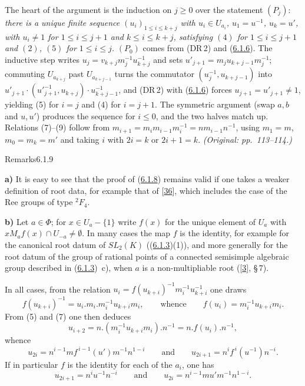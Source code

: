 \documentclass[12pt,a4paper,oneside,english]{smfart}
\makeatletter
\newcommand{\btanchor}[1]{\leavevmode\Hy@raisedlink{\hypertarget{bt:#1}{}}}
\newcommand{\btref}[1]{\hyperlink{bt:#1}{#1}}
\newcommand{\btbib}[1]{\hyperlink{bib:#1}{#1}}
\theoremstyle{definition}
\theoremstyle{bt}
\makeatother
\begin{document}
\begin{sketch}
The heart of the argument is the induction on $j\ge0$ over the statement
$(P_j)$: \emph{there is a unique finite sequence $(u_i)_{1\le i\le k+j}$ with
$u_i\in U_{a_i}$, $u_1=u^{-1}$, $u_k=u'$, with $u_i\ne1$ for $1\le i\le j+1$ and
$k\le i\le k+j$, satisfying $(4)$ for $1\le i\le j+1$ and $(2)$, $(5)$ for
$1\le i\le j$.} $(P_0)$ comes from (DR\,2) and (\btref{6.1.6}). The inductive step writes
$u_j=v_{k+j}m_j^{-1}u_{k+j}^{-1}$ and sets
$u'_{j+1}=m_ju_{k+j-1}m_j^{-1}$; commuting $U_{a_{k+j}}$ past $U_{a_{k+j-1}}$
turns the commutator $(u_j^{-1},u_{k+j-1})$ into
$u'_{j+1}\cdot(u'^{-1}_{j+1},u_{k+j})\cdot u_{k+j-1}^{-1}$, and (DR\,2) with
(\btref{6.1.6}) forces $u_{j+1}=u'_{j+1}\ne1$, yielding (5) for $i=j$ and (4) for
$i=j+1$. The symmetric argument (swap $a,b$ and $u,u'$) produces the sequence for
$i\le0$, and the two halves match up. Relations (7)--(9) follow from
$m_{i+1}=m_im_{i-1}m_i^{-1}=nm_{i-1}n^{-1}$, using $m_1=m$, $m_0=m_k=m'$ and
taking $i$ with $2i=k$ or $2i+1=k$. \emph{(Original: pp.~113--114.)}
\end{sketch}

\begin{stmt}{Remarks}{6.1.9}\btanchor{6.1.9}
\end{stmt}
\noindent\textbf{a)} It is easy to see that the proof of (\btref{6.1.8}) remains valid if
one takes a weaker definition of root data, for example that of [\btbib{36}], which
includes the case of the Ree groups of type ${}^{2}F_4$.

\medskip
\noindent\textbf{b)} Let $a\in\Phi$; for $x\in U_a-\{1\}$ write $f(x)$ for the
unique element of $U_a$ with $xM_af(x)\cap U_{-a}\ne\emptyset$. In many cases the
map $f$ is the identity, for example for the canonical root datum of $SL_2(K)$
((\btref{6.1.3})(1)), and more generally for the root datum of the group of rational
points of a connected semisimple algebraic group described in (\btref{6.1.3})~c), when
$a$ is a non-multipliable root ([\btbib{3}], \S\,7).

In all cases, from the relation $u_i=f(u_{k+i})^{-1}m_i^{-1}u_{k+i}^{-1}$ one
draws
\[ f(u_{k+i})^{-1}=u_i.m_i.m_i^{-1}u_{k+i}m_i,\qquad\text{whence}\qquad
   f(u_i)=m_i^{-1}u_{k+i}m_i. \]
From (5) and (7) one then deduces
\[ u_{i+2}=n.(m_i^{-1}u_{k+i}m_i).n^{-1}=n.f(u_i).n^{-1}, \]
whence
\[ u_{2i}=n^{i-1}mf^{\,i-1}(u')m^{-1}n^{1-i}\qquad\text{and}\qquad
   u_{2i+1}=n^{i}f^{\,i}(u^{-1})n^{-i}. \]
If in particular $f$ is the identity for each of the $a_i$, one has
\[ u_{2i+1}=n^{i}u^{-1}n^{-i}\qquad\text{and}\qquad
   u_{2i}=n^{i-1}mu'm^{-1}n^{1-i}. \]
\end{document}
